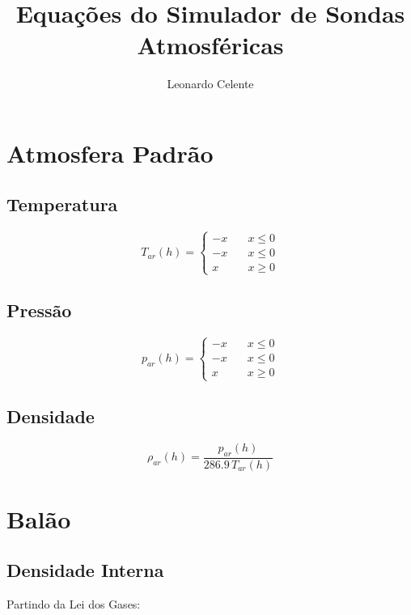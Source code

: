 \documentclass[a4paper, 12pt]{article}
\title{Equações do Simulador de Sondas Atmosféricas}
\author{Leonardo Celente}
\begin{document}
\maketitle
\tableofcontents
\pagebreak
\section{Atmosfera Padrão}
\subsection {Temperatura}

\begin{equation}
  T_{ar}(h)  = \left\{
  \begin{array}{ll}
    -x & \quad x \leq 0 \\
    -x & \quad x \leq 0 \\
    x  & \quad x \geq 0
  \end{array}
  \right.
\end{equation}


\subsection {Pressão}

\begin{equation}
  p_{ar}(h)  = \left\{
  \begin{array}{ll}
    -x & \quad x \leq 0 \\
    -x & \quad x \leq 0 \\
    x  & \quad x \geq 0
  \end{array}
  \right.
\end{equation}


\subsection {Densidade}
\begin{equation}
  \rho_{ar}(h) = \frac{p_{ar}(h)}{286.9 \, T_{ar}(h)}
\end{equation}

\section {Balão}
\subsection {Densidade Interna}

Partindo da Lei dos Gases:
\end{document}
